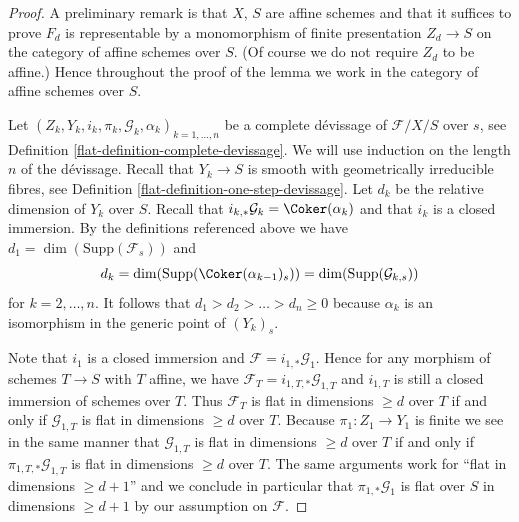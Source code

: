 \begin{proof}

A preliminary remark is that $X$, $S$ are affine schemes and that it
suffices to prove $F_d$ is representable by a monomorphism of finite
presentation $Z_d \to S$ on the category of affine schemes over $S$.
(Of course we do not require $Z_d$ to be affine.)
Hence throughout the proof of
the lemma we work in the category of affine schemes over $S$.

\medskip\noindent
Let $(Z_k, Y_k, i_k, \pi_k, \mathcal{G}_k, \alpha_k)_{k = 1, \ldots, n}$
be a complete d\'evissage of $\mathcal{F}/X/S$ over $s$, see
Definition \ref{flat-definition-complete-devissage}.
We will use induction on the length $n$ of the d\'evissage.
Recall that $Y_k \to S$ is smooth with geometrically irreducible fibres, see
Definition \ref{flat-definition-one-step-devissage}.
Let $d_k$ be the relative dimension of $Y_k$ over $S$.
Recall that $i_{k, *}\mathcal{G}_k = \Coker(\alpha_k)$ and
that $i_k$ is a closed immersion.
By the definitions referenced above we have
$d_1 = \dim(\text{Supp}(\mathcal{F}_s))$ and
$$
d_k = \dim(\text{Supp}(\Coker(\alpha_{k - 1})_s))
= \dim(\text{Supp}(\mathcal{G}_{k, s}))
$$
for $k = 2, \ldots, n$. It follows that $d_1 > d_2 > \ldots > d_n \geq 0$
because $\alpha_k$ is an isomorphism in the generic point of $(Y_k)_s$.

\medskip\noindent
Note that $i_1$ is a closed immersion and
$\mathcal{F} = i_{1, *}\mathcal{G}_1$.
Hence for any morphism of schemes $T \to S$ with $T$ affine,
we have $\mathcal{F}_T = i_{1, T, *}\mathcal{G}_{1, T}$ and
$i_{1, T}$ is still a closed immersion of schemes over $T$.
Thus $\mathcal{F}_T$ is flat in dimensions $\geq d$ over $T$
if and only if $\mathcal{G}_{1, T}$ is flat in dimensions $\geq d$ over $T$.
Because $\pi_1 : Z_1 \to Y_1$ is finite we see in the same manner that
$\mathcal{G}_{1, T}$ is flat in dimensions $\geq d$ over $T$
if and only if $\pi_{1, T, *}\mathcal{G}_{1, T}$ is flat in dimensions
$\geq d$ over $T$. The same arguments work for
``flat in dimensions $\geq d + 1$'' and we conclude in particular that
$\pi_{1, *}\mathcal{G}_1$ is flat over $S$ in dimensions $\geq d + 1$
by our assumption on $\mathcal{F}$.


\end{proof}
